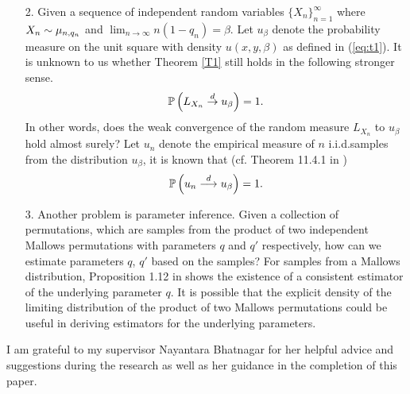 \begin{itemize}
\item[2.] Given a sequence of independent random variables $\{X_n\}_{n = 1}^{\infty}$ where $X_n \sim \mu_{n, q_n}$ and $\lim_{n \to \infty} n(1-q_n) = \beta$. Let $u_{\beta}$ denote the probability measure on the unit square with density $u(x, y, \beta)$ as defined in (\ref{eq:t1}). It is unknown to us whether Theorem \ref{T1} still holds in the following stronger sense.
\begin{equation}
\mathbb{P}\left(L_{X_n} \overset{d}{\rightarrow} u_{\beta}\right) = 1.
\end{equation}
In other words, does the weak convergence of the random measure $L_{X_n}$ to $u_{\beta}$ hold almost surely? Let $u_n$ denote the empirical measure of $n$ i.i.d.\newline samples from the distribution $u_{\beta}$, it is known that (cf. Theorem 11.4.1 in \cite{Dudley})
\begin{equation}
\mathbb{P}\left(u_n \overset{d}{\longrightarrow} u_{\beta}\right) = 1.
\end{equation}

\item[3.]
Another problem is parameter inference. Given a collection of permutations, which are samples from the product of two independent Mallows permutations with parameters $q$ and $q'$ respectively, how can we estimate parameters $q$, $q'$ based on the samples? For samples from a Mallows distribution, Proposition 1.12  in \cite{Mukherjee} shows the existence of a consistent estimator of the underlying parameter $q$. It is possible that the explicit density of the limiting distribution of the product of two Mallows permutations could be useful in deriving estimators for the underlying parameters.
\end{itemize}



\begin{acknowledgements}
I am grateful to my supervisor Nayantara Bhatnagar for her helpful advice and suggestions during the research as well as her guidance in the completion of this paper. 
\end{acknowledgements}






